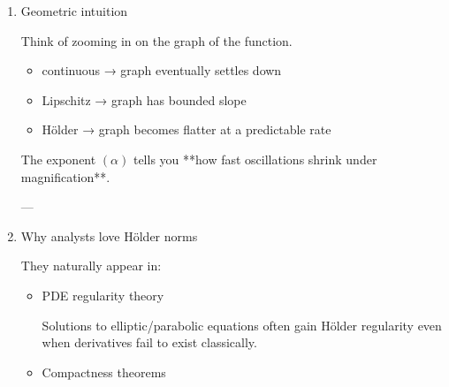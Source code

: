 \documentclass[12pt,a4paper]{report}
\begin{document}
\begin{description}
\begin{enumerate}
\begin{enumerate}
$$
\sup |u|
$$

\item Smoothness (oscillation control)

$$
[u]_{C^{0,\alpha}} = \sup_{x\neq y}
\frac{|u(x)-u(y)|}{|x-y|^\alpha}.
$$
\end{enumerate}


The Hölder norm combines them:

$$|u|_{C^{0,\alpha}}=\sup |u|+[u]_{C^{0,\alpha}}.$$

Motivation:

\begin{itemize}

\item  makes the space **complete** (Banach space)
\item allows convergence + compactness arguments
\item controls oscillation at *all scales*

\end{itemize}
This scale-sensitive control is exactly what many PDE estimates require.

\item Geometric intuition

Think of zooming in on the graph of the function.

\begin{itemize}

\item continuous → graph eventually settles down
\item Lipschitz → graph has bounded slope
\item Hölder → graph becomes flatter at a predictable rate

\end{itemize}
The exponent $( \alpha )$ tells you **how fast oscillations shrink under magnification**.

---

\item Why analysts love Hölder norms

They naturally appear in:

\begin{itemize}

\item PDE regularity theory

Solutions to elliptic/parabolic equations often gain Hölder regularity even when derivatives fail to exist classically.

\item Compactness theorems


\end{itemize}
\end{enumerate}
\end{description}
\end{document}
